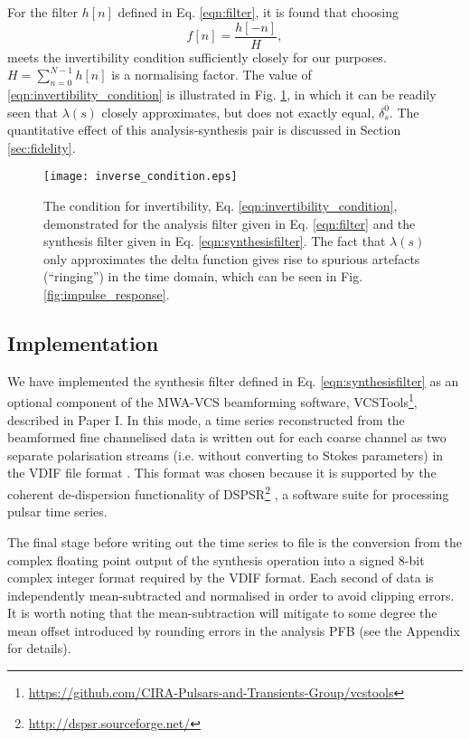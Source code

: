 \documentclass{pasa}%
\newcommand{\PaperI}{Paper I\nocite{Ord2019}}
\newcommand{\Kron}{\delta_s^0}
\newcommand{\vcstools}{VCSTools}
\begin{document}
For the filter $h[n]$ defined in Eq. \eqref{eqn:filter}, it is found that choosing
\begin{equation}
    f[n] = \frac{h[-n]}{H},
    \label{eqn:synthesisfilter}
\end{equation}
meets the invertibility condition sufficiently closely for our purposes.
$H = \sum_{n=0}^{N-1} h[n]$ is a normalising factor.
The value of \eqref{eqn:invertibility_condition} is illustrated in Fig. \ref{fig:inverse_condition}, in which it can be readily seen that $\lambda(s)$ closely approximates, but does not exactly equal, $\Kron$.
The quantitative effect of this analysis-synthesis pair is discussed in Section \ref{sec:fidelity}.
\begin{figure}
    \centering
    \texttt{[image: inverse\_condition.eps]}
    \caption{The condition for invertibility, Eq. \eqref{eqn:invertibility_condition}, demonstrated for the analysis filter given in Eq. \eqref{eqn:filter} and the synthesis filter given in Eq. \eqref{eqn:synthesisfilter}. The fact that $\lambda(s)$ only approximates the delta function gives rise to spurious artefacts (``ringing'') in the time domain, which can be seen in Fig. \ref{fig:impulse_response}.}
    \label{fig:inverse_condition}
\end{figure}

\subsection{Implementation}

We have implemented the synthesis filter defined in Eq. \eqref{eqn:synthesisfilter} as an optional component of the MWA-VCS beamforming software, \vcstools{}\footnote{\url{https://github.com/CIRA-Pulsars-and-Transients-Group/vcstools}}, described in \PaperI{}.
In this mode, a time series reconstructed from the beamformed fine channelised data is written out for each coarse channel as two separate polarisation streams (i.e. without converting to Stokes parameters) in the VDIF file format \citep{Whitney2009}.
This format was chosen because it is supported by the coherent de-dispersion functionality of DSPSR\footnote{\url{http://dspsr.sourceforge.net/}} \citep{VanStraten2011b}, a software suite for processing pulsar time series.

The final stage before writing out the time series to file is the conversion from the complex floating point output of the synthesis operation into a signed 8-bit complex integer format required by the VDIF format.
Each second of data is independently mean-subtracted and normalised in order to avoid clipping errors.
It is worth noting that the mean-subtraction will mitigate to some degree the mean offset introduced by rounding errors in the analysis PFB (see the Appendix for details).
\end{document}
